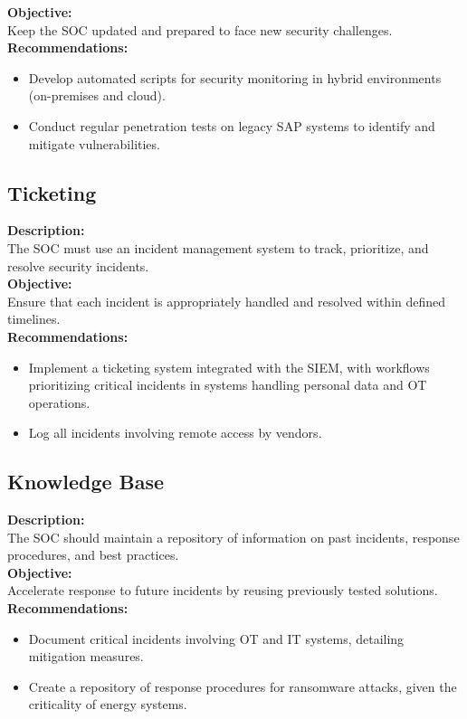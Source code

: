 \textbf{Objective:} \\
Keep the SOC updated and prepared to face new security challenges. \\

\textbf{Recommendations:}
\begin{itemize}
    \item Develop automated scripts for security monitoring in hybrid environments (on-premises and cloud).
    \item Conduct regular penetration tests on legacy SAP systems to identify and mitigate vulnerabilities.
\end{itemize}

\subsection*{Ticketing}
\textbf{Description:} \\
The SOC must use an incident management system to track, prioritize, and resolve security incidents. \\

\textbf{Objective:} \\
Ensure that each incident is appropriately handled and resolved within defined timelines. \\

\textbf{Recommendations:}
\begin{itemize}
    \item Implement a ticketing system integrated with the SIEM, with workflows prioritizing critical incidents in systems handling personal data and OT operations.
    \item Log all incidents involving remote access by vendors.
\end{itemize}

\subsection*{ Knowledge Base}
\textbf{Description:} \\
The SOC should maintain a repository of information on past incidents, response procedures, and best practices. \\

\textbf{Objective:} \\
Accelerate response to future incidents by reusing previously tested solutions. \\

\textbf{Recommendations:}
\begin{itemize}
    \item Document critical incidents involving OT and IT systems, detailing mitigation measures.
    \item Create a repository of response procedures for ransomware attacks, given the criticality of energy systems.
\end{itemize}

